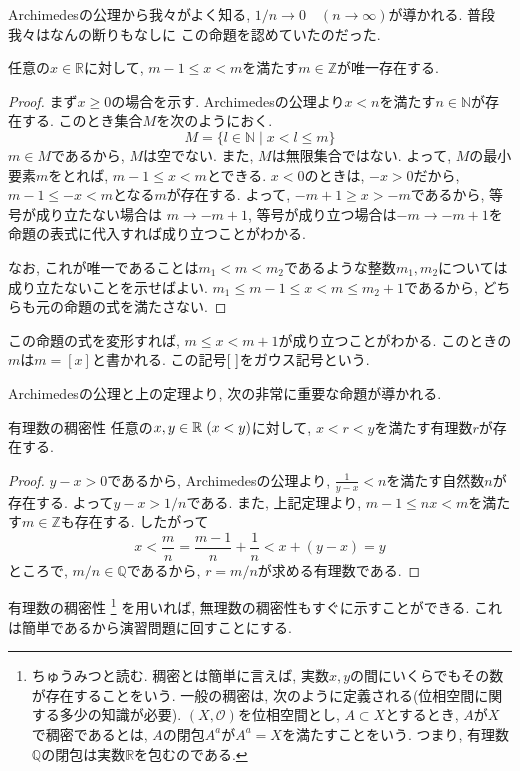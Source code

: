         Archimedesの公理から我々がよく知る, $1/n\rightarrow 0\quad (n\rightarrow\infty)$が導かれる. 普段我々はなんの断りもなしに
        この命題を認めていたのだった.

        \begin{screen}
            任意の$x\in\mathbb{R}$に対して, $m-1\leq x<m$を満たす$m\in\mathbb{Z}$が唯一存在する.
        \end{screen}
        \begin{proof}
            まず$x\geq 0$の場合を示す. Archimedesの公理より$x<n$を満たす$n\in\mathbb{N}$が存在する. このとき集合$M$を次のようにおく.
            \begin{equation*}
                M=\{l\in\mathbb{N}\mid x<l\leq m\}
            \end{equation*}
            $m\in M$であるから, $M$は空でない. また, $M$は無限集合ではない. よって, $M$の最小要素$m$をとれば, $m-1\leq x<m$とできる.
            $x<0$のときは, $-x>0$だから, $m-1\leq-x<m$となる$m$が存在する. よって, $-m+1\geq x>-m$であるから, 等号が成り立たない場合は
            $m\rightarrow -m+1$, 等号が成り立つ場合は$-m\rightarrow -m+1$を命題の表式に代入すれば成り立つことがわかる. 

            なお, これが唯一であることは$m_1<m<m_2$であるような整数$m_1,m_2$については成り立たないことを示せばよい. 
            $m_1\leq m-1\leq x<m\leq m_2+1$であるから, どちらも元の命題の式を満たさない.
        \end{proof}
        この命題の式を変形すれば, $m\leq x<m+1$が成り立つことがわかる. このときの$m$は$m=[x]$と書かれる. この記号$[\hspace{1mm}]$をガウス記号という. 

        Archimedesの公理と上の定理より, 次の非常に重要な命題が導かれる.
        \begin{itembox}{有理数の稠密性}
            任意の$x,y\in\mathbb{R}\hspace{1mm}(x<y)$に対して, $x<r<y$を満たす有理数$r$が存在する.
        \end{itembox}
        \begin{proof}
            $y-x>0$であるから, Archimedesの公理より, $\frac{1}{y-x}<n$を満たす自然数$n$が存在する. よって$y-x>1/n$である. 
            また, 上記定理より, $m-1\leq nx < m$を満たす$m\in\mathbb{Z}$も存在する. したがって
            \begin{equation*}
                x<\frac{m}{n}=\frac{m-1}{n}+\frac{1}{n}<x+(y-x)=y
            \end{equation*}
            ところで, $m/n\in\mathbb{Q}$であるから, $r=m/n$が求める有理数である.
        \end{proof}
        有理数の稠密性
        \footnote{ちゅうみつと読む. 稠密とは簡単に言えば, 実数$x,y$の間にいくらでもその数が存在することをいう. 一般の稠密は, 次のように定義される(位相空間に関する多少の知識が必要). 
        $(X,\mathcal{O})$を位相空間とし, $A\subset X$とするとき, $A$が$X$で稠密であるとは, $A$の閉包$A^a$が$A^a=X$を満たすことをいう. 
        つまり, 有理数$\mathbb{Q}$の閉包は実数$\mathbb{R}$を包むのである.}
        を用いれば, 無理数の稠密性もすぐに示すことができる. これは簡単であるから演習問題に回すことにする.
        \clearpage
        
